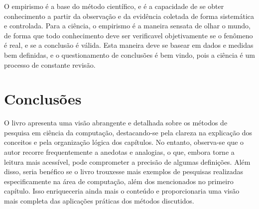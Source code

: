 \documentclass[
	12pt,				%
	openright,			%
	oneside,			%
	a4paper,			%
	chapter=TITLE,		%
	subsection=TITLE,	%
	english,			%
	brazilian,				%
	]{abntex2}
\begin{document}
O empirismo é a base do método científico, e é a capacidade de se obter conhecimento a partir da observação e da evidência coletada de forma sistemática e controlada. Para a ciência, o empirismo é a maneira sensata de olhar o mundo, de forma que todo conhecimento deve ser verificavel objetivamente se o fenômeno é real, e se a conclusão é válida. Esta maneira deve se basear em dados e medidas bem definidas, e o questionamento de conclusões é bem vindo, pois a ciência é um processo de constante revisão.

\section*{Conclusões}
O livro apresenta uma visão abrangente e detalhada sobre os métodos de pesquisa em ciência da computação, destacando-se pela clareza na explicação dos conceitos e pela organização lógica dos capítulos. No entanto, observa-se que o autor recorre frequentemente a anedotas e analogias, o que, embora torne a leitura mais acessível, pode comprometer a precisão de algumas definições. Além disso, seria benéfico se o livro trouxesse mais exemplos de pesquisas realizadas especificamente na área de computação, além dos mencionados no primeiro capítulo. Isso enriqueceria ainda mais o conteúdo e proporcionaria uma visão mais completa das aplicações práticas dos métodos discutidos.
\end{document}
